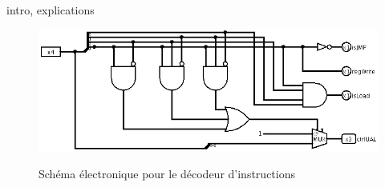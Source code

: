 \paragraph{}{
	intro, explications
}

\begin{figure}
	\includegraphics[scale=0.6]{circuits/deco_instru.png}
	\label{selec_reg_circ}
	\caption{Sch\'{e}ma \'{e}lectronique pour le d\'{e}codeur d'instructions}
\end{figure}
